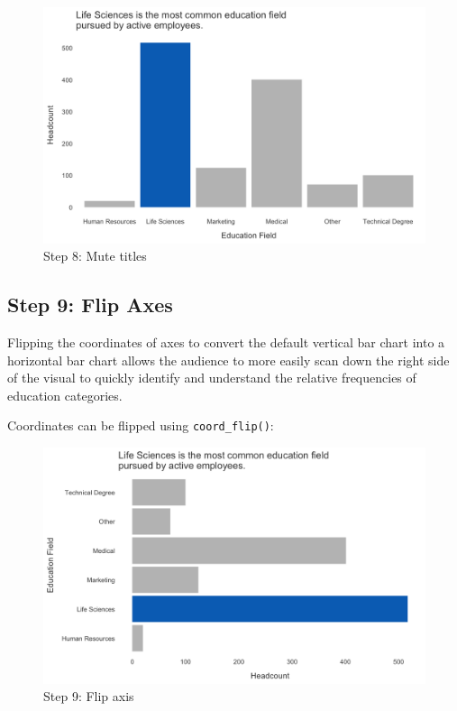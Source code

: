 \documentclass[
]{book}
\begin{document}
\begin{figure}

{\centering \includegraphics[width=1\linewidth]{graphics/viz_step_8} 

}

\caption{Step 8: Mute titles}\label{fig:barchart-8}
\end{figure}

\hypertarget{step-9-flip-axes}{%
\subsection{Step 9: Flip Axes}\label{step-9-flip-axes}}

Flipping the coordinates of axes to convert the default vertical bar chart into a horizontal bar chart allows the audience to more easily scan down the right side of the visual to quickly identify and understand the relative frequencies of education categories.

Coordinates can be flipped using \texttt{coord\_flip()}:

\begin{figure}

{\centering \includegraphics[width=1\linewidth]{graphics/viz_step_9} 

}

\caption{Step 9: Flip axis}\label{fig:barchart-9}
\end{figure}
\end{document}
